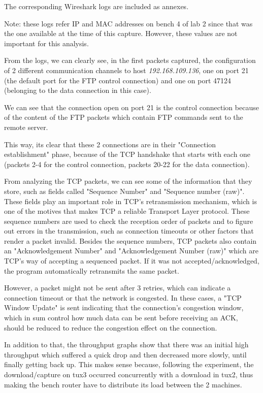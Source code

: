 The corresponding Wireshark logs are included as annexes.

Note: these logs refer IP and MAC addresses on bench 4 of lab 2 since that was the one available at the time of this capture. However, these values are not important for this analysis.

From the logs, we can clearly see, in the first packets captured, the configuration of 2 different communication channels to host \textit{192.168.109.136}, one on port 21 (the default port for the FTP control connection) and one on port 47124 (belonging to the data connection in this case).

We can see that the connection open on port 21 is the control connection because of the content of the FTP packets which contain FTP commands sent to the remote server.

This way, its clear that these 2 connections are in their "Connection establishment" phase, because of the TCP handshake that starts with each one (packets 2-4 for the control connection, packets 20-22 for the data connection).

From analyzing the TCP packets, we can see some of the information that they store, such as fields called "Sequence Number" and "Sequence number (raw)". These fields play an important role in TCP's retransmission mechanism, which is one of the motives that makes TCP a reliable Transport Layer protocol. These sequence numbers are used to check the reception order of packets and to figure out errors in the transmission, such as connection timeouts or other factors that render a packet invalid. Besides the sequence numbers, TCP packets also contain an "Acknowledgement Number" and "Acknowledgement Number (raw)" which are TCP's way of accepting a sequenced packet. If it was not accepted/acknowledged, the program automatically retransmits the same packet.

However, a packet might not be sent after 3 retries, which can indicate a connection timeout or that the network is congested. In these cases, a "TCP Window Update" is sent indicating that the connection's congestion window, which in sum control how much data can be sent before receiving an ACK, should be reduced to reduce the congestion effect on the connection.

In addition to that, the throughput graphs show that there was an initial high throughput which suffered a quick drop and then decreased more slowly, until finally getting back up. This makes sense because, following the experiment, the download/capture on tux3 occurred concurrently with a download in tux2, thus making the bench router have to distribute its load between the 2 machines.

